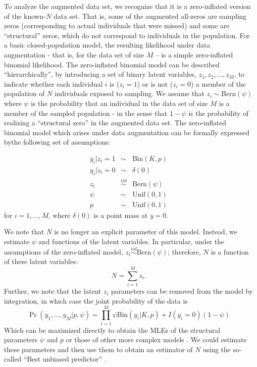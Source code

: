 To analyze the augmented data set, we recognize that it is a
zero-inflated version of the known-$N$ data set. That is, some of the
augmented all-zeros are sampling zeros (corresponding to actual
individuals that were missed) and some are ``structural'' zeros, which
do not correspond to individuals in the population. For a basic
closed-population model, the resulting likelihood under data
augmentation - that is, for the data set of size $M$ -- is a simple
zero-inflated binomial likelihood.  The zero-inflated binomial model
can be described ``hierarchically'', by introducing a set of binary
latent variables, $z_{1},z_{2},\ldots, z_{M}$, to indicate whether
each individual $i$ is ($z_i=1$) or is not ($z_i=0$) a member of the
population of $N$ individuals exposed to sampling. We assume that
$z_{i} \sim \mbox{Bern}(\psi)$ where $\psi$ is the probability that an
individual in the data set of size $M$ is a member of the sampled
population - in the sense that $1-\psi$ is the probability of
realizing a ``structural zero'' in the augmented data set.  The
zero-inflated binomial model which arises under data augmentation can
be formally expressed bythe following set of assumptions:

\begin{eqnarray*}
 y_{i}|{z_{i}=1} & \sim  &\mbox{Bin}(K, p) \\
 y_{i}|{z_{i}=0} & \sim &  \delta(0)  \\
 z_{i} & \stackrel{iid}{\sim} & \mbox{Bern}(\psi) \\
 \psi & \sim & \mathrm{Unif}(0,1) \\
 p & \sim & \mathrm{Unif}(0,1)
\end{eqnarray*}
for $i=1, \ldots, M$, where $\delta(0)$ is a point mass at $y=0$. 

We note that $N$ is no longer an explicit parameter of this
model. Instead, we estimate $\psi$ and functions of the latent
variables. In particular, under the assumptions of the zero-inflated
model, $z_{i} \stackrel{iid}{\sim} \mbox{Bern}(\psi)$; therefore, $N$
is a function of these latent variables:
 \[
 N = \sum_{i=1}^{M} z_{i}.
\]
Further, we note that the latent $z_i$ parameters can be removed from
the model by integration, in which case the joint probability of the
data is
\begin{equation}
  \Pr(y_1, \ldots, y_M | p, \psi) = \prod_{i=1}^M  \psi \mathrm{Bin}(y_i | K, p) +  I(y_i=0) (1-\psi)
\end{equation}
Which can be maximized directly to obtain the MLEs of the structural
parameters $\psi$ and $p$ or those of other more complex models
\citep[e.g., see][]{royle:2006}. We could estimate these parameters
and then use them to obtain an estimator of $N$ using the so-called
``Best unbiased predictor'' \citep[see][]{royle_dorazio:2011}.

